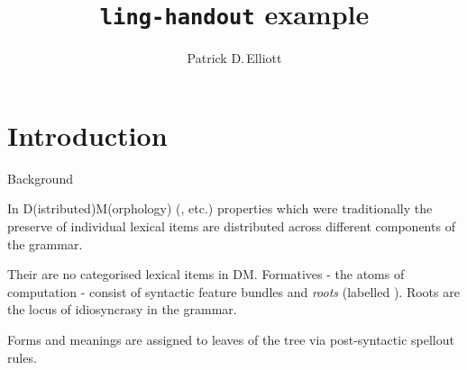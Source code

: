 \documentclass[twocolumn,landscape,12pt,paper=a4,DIV=15]{ling-handout}
\title{\texttt{ling-handout} example}
\author{Patrick D.\,Elliott}
\begin{document}
\maketitle

\section{Introduction}

\begin{frame}{Background}

  In D(istributed)M(orphology) (\citealt{halle1993,halle2000}, etc.) properties
  which were traditionally the preserve of individual lexical items are
  distributed across different components of the grammar.

  Their are no categorised lexical items in DM. Formatives - the atoms of
  computation - consist of syntactic feature bundles and \emph{roots} (labelled
  \dmroot{}). Roots are the locus of idiosyncrasy in the grammar.
  \begin{center}
\end{center}
%
    Forms and meanings are assigned to leaves of the tree via post-syntactic
    spellout rules.

\end{frame}
\end{document}

